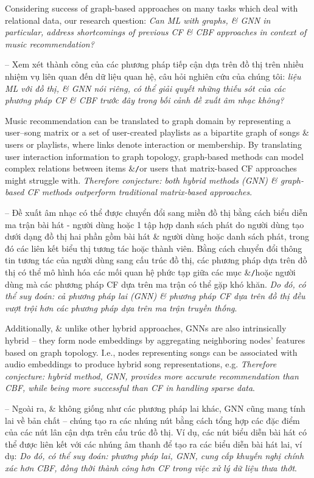\documentclass{article}
\begin{document}
\begin{itemize}
    Considering success of graph-based approaches on many tasks which deal with relational data, our research question: {\it Can ML with graphs, \& GNN in particular, address shortcomings of previous CF \& CBF approaches in context of music recommendation?}

    -- Xem xét thành công của các phương pháp tiếp cận dựa trên đồ thị trên nhiều nhiệm vụ liên quan đến dữ liệu quan hệ, câu hỏi nghiên cứu của chúng tôi: {\it liệu ML với đồ thị, \& GNN nói riêng, có thể giải quyết những thiếu sót của các phương pháp CF \& CBF trước đây trong bối cảnh đề xuất âm nhạc không?}

    Music recommendation can be translated to graph domain by representing a user--song matrix or a set of user-created playlists as a bipartite graph of songs \& users or playlists, where links denote interaction or membership. By translating user interaction information to graph topology, graph-based methods can model complex relations between items \&{\tt/}or users that matrix-based CF approaches might struggle with. {\it Therefore conjecture: both hybrid methods (GNN) \& graph-based CF methods outperform traditional matrix-based approaches}.

    -- Đề xuất âm nhạc có thể được chuyển đổi sang miền đồ thị bằng cách biểu diễn ma trận bài hát - người dùng hoặc 1 tập hợp danh sách phát do người dùng tạo dưới dạng đồ thị hai phần gồm bài hát \& người dùng hoặc danh sách phát, trong đó các liên kết biểu thị tương tác hoặc thành viên. Bằng cách chuyển đổi thông tin tương tác của người dùng sang cấu trúc đồ thị, các phương pháp dựa trên đồ thị có thể mô hình hóa các mối quan hệ phức tạp giữa các mục \&{\tt/}hoặc người dùng mà các phương pháp CF dựa trên ma trận có thể gặp khó khăn. {\it Do đó, có thể suy đoán: cả phương pháp lai (GNN) \& phương pháp CF dựa trên đồ thị đều vượt trội hơn các phương pháp dựa trên ma trận truyền thống}.

    Additionally, \& unlike other hybrid approaches, GNNs are also intrinsically hybrid -- they form node embeddings by aggregating neighboring nodes' features based on graph topology. I.e., nodes representing songs can be associated with audio embeddings to produce hybrid song representations, e.g. {\it Therefore conjecture: hybrid method, GNN, provides more accurate recommendation than CBF, while being more successful than CF in handling sparse data}.

    -- Ngoài ra, \& không giống như các phương pháp lai khác, GNN cũng mang tính lai về bản chất -- chúng tạo ra các nhúng nút bằng cách tổng hợp các đặc điểm của các nút lân cận dựa trên cấu trúc đồ thị. Ví dụ, các nút biểu diễn bài hát có thể được liên kết với các nhúng âm thanh để tạo ra các biểu diễn bài hát lai, ví dụ: {\it Do đó, có thể suy đoán: phương pháp lai, GNN, cung cấp khuyến nghị chính xác hơn CBF, đồng thời thành công hơn CF trong việc xử lý dữ liệu thưa thớt}.


\end{itemize}
\end{document}
